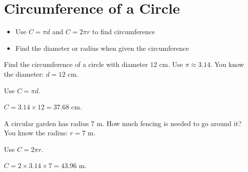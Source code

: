 \section{Circumference of a Circle}

\begin{stepGoal}
\begin{itemize}
    \item Use $C = \pi d$ and $C = 2\pi r$ to find circumference
    \item Find the diameter or radius when given the circumference
\end{itemize}
\end{stepGoal}

\begin{stepVocabBox}
\end{stepVocabBox}

\begin{stepsCard}
\end{stepsCard}

\begin{stepExample}{Find the circumference of a circle with diameter $12$ cm. Use $\pi \approx 3.14$.}
     You know the diameter: $d = 12$ cm.

     Use $C = \pi d$.

     $C = 3.14 \times 12 = 37.68$ cm.
\end{stepExample}

\begin{stepExample}{A circular garden has radius $7$ m. How much fencing is needed to go around it?}
     You know the radius: $r = 7$ m.

     Use $C = 2\pi r$.

     $C = 2 \times 3.14 \times 7 = 43.96$ m.
\end{stepExample}

